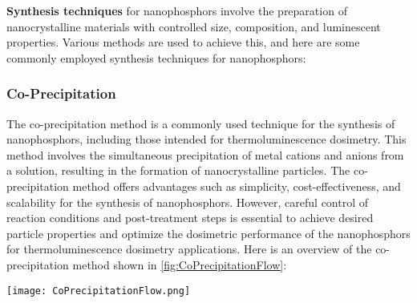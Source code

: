\documentclass[../../Report.tex]{subfiles}
\begin{document}
    \textbf{Synthesis techniques} for nanophosphors involve the preparation of nanocrystalline materials with controlled size, 
    composition, and luminescent properties. Various methods are used to achieve this, and here are some commonly 
    employed synthesis techniques for nanophosphors:

    \subsubsection{Co-Precipitation}
        The co-precipitation method \cite{a8} is a commonly used technique for the synthesis of nanophosphors, including 
        those intended for thermoluminescence dosimetry. This method involves the simultaneous precipitation of 
        metal cations and anions from a solution, resulting in the formation of nanocrystalline particles.
        The co-precipitation method offers advantages such as simplicity, cost-effectiveness, and scalability for 
        the synthesis of nanophosphors. However, careful control of reaction conditions and post-treatment steps 
        is essential to achieve desired particle properties and optimize the dosimetric performance of the 
        nanophosphors for thermoluminescence dosimetry applications. Here is an overview of the co-precipitation 
        method shown in \ref{fig:CoPrecipitationFlow}:
        \begin{Figure}
            \centering
            \texttt{[image: CoPrecipitationFlow.png]}
            \label{fig:CoPrecipitationFlow}
        \end{Figure}
\end{document}
